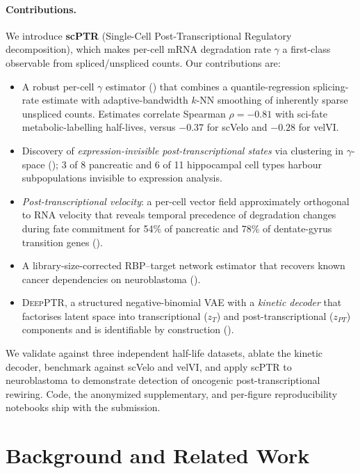 \documentclass{article}
\begin{document}
\paragraph{Contributions.} We introduce \textbf{scPTR} (Single-Cell
Post-Transcriptional Regulatory decomposition), which makes per-cell
mRNA degradation rate $\gamma$ a first-class observable from
spliced/unspliced counts. Our contributions are:
\begin{itemize}\setlength\itemsep{1pt}
  \item A robust per-cell $\gamma$ estimator () that combines
    a quantile-regression splicing-rate estimate with adaptive-bandwidth
    $k$-NN smoothing of inherently sparse unspliced counts. Estimates correlate
    Spearman $\rho{=}{-}0.81$ with sci-fate metabolic-labelling half-lives,
    versus $-0.37$ for scVelo and $-0.28$ for velVI.
  \item Discovery of \emph{expression-invisible post-transcriptional states}
    via clustering in $\gamma$-space (); 3 of 8
    pancreatic and 6 of 11 hippocampal cell types harbour subpopulations
    invisible to expression analysis.
  \item \emph{Post-transcriptional velocity}: a per-cell vector field
    approximately orthogonal to RNA velocity that reveals temporal precedence
    of degradation changes during fate commitment for 54\% of pancreatic and
    78\% of dentate-gyrus transition genes ().
  \item A library-size-corrected RBP--target network estimator that recovers
    known cancer dependencies on neuroblastoma ().
  \item \textsc{DeepPTR}, a structured negative-binomial VAE with a
    \emph{kinetic decoder} that factorises latent space into transcriptional
    ($z_T$) and post-transcriptional ($z_{PT}$) components and is identifiable
    by construction ().
\end{itemize}
We validate against three independent half-life datasets, ablate the kinetic
decoder, benchmark against scVelo and velVI, and apply scPTR to neuroblastoma
to demonstrate detection of oncogenic post-transcriptional rewiring. Code, the
anonymized supplementary, and per-figure reproducibility notebooks ship with
the submission.

\section{Background and Related Work}
\label{sec:related}
\end{document}
